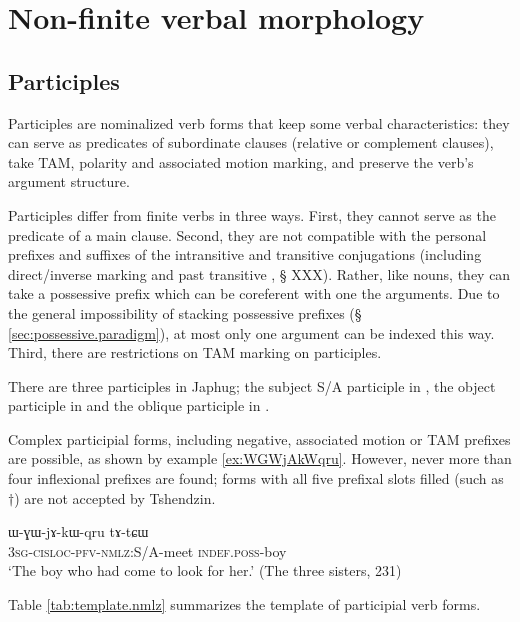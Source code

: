 \chapter{Non-finite verbal morphology}

\section{Participles}
Participles are nominalized verb forms that keep some verbal characteristics: they can serve as predicates of subordinate clauses (relative or complement clauses), take TAM, polarity and associated motion marking, and preserve the verb's argument structure.

Participles differ from finite verbs in three ways. First, they cannot serve as the predicate of a main clause. Second, they are not compatible with the personal prefixes and suffixes of the intransitive and transitive conjugations (including direct/inverse marking and past transitive , § XXX). Rather, like nouns, they can take a possessive prefix which can be coreferent with one the arguments. Due to the general impossibility of stacking possessive prefixes (§ \ref{sec:possessive.paradigm}), at most only one argument can be indexed this way. Third, there are restrictions on TAM marking on participles.

There are three participles in Japhug; the subject S/A participle in , the object participle in  and the oblique participle in . 

Complex participial forms, including negative, associated motion or TAM prefixes are possible, as shown by example \ref{ex:WGWjAkWqru}. However, never more than four inflexional prefixes are found; forms with all five prefixal slots filled (such as $\dagger$) are not accepted by Tshendzin.

 \begin{exe}
\ex \label{ex:WGWjAkWqru}
\gll ɯ-ɣɯ-jɤ-kɯ-qru  	tɤ-tɕɯ  	   \\
  \textsc{3sg-cisloc-pfv-nmlz:}S/A-meet \textsc{indef.poss}-boy   \\
\glt `The boy who had come to look for her.' (The three sisters, 231)
 \end{exe}

Table \ref{tab:template.nmlz} summarizes the template of participial verb forms.

\begin{table}[h]
\caption{The template of participial verb forms in Japhug} \centering \label{tab:template.nmlz}
\end{table}

